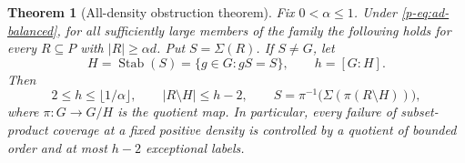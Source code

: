 \documentclass[11pt,a4paper]{article}
\newtheorem{theorem}{Theorem}[section]
\theoremstyle{definition}
\theoremstyle{remark}
\begin{document}
\begin{theorem}[All-density obstruction theorem]\label{p-thm:all-density}
Fix $0<\alpha\leq1$. Under \eqref{p-eq:ad-balanced}, for all sufficiently
large members of the family the following holds for every
$R\subseteq P$ with $|R|\geq\alpha d$.
Put $S=\Sigma(R)$. If $S\ne G$, let
\[
 H=\operatorname{Stab}(S)=\{g\in G:gS=S\},\qquad h=[G:H].
\]
Then
\begin{equation}\label{p-eq:ad-classification}
 2\leq h\leq\lfloor1/\alpha\rfloor,
 \qquad |R\setminus H|\leq h-2,
 \qquad
 S=\pi^{-1}\bigl(\Sigma(\pi(R\setminus H))\bigr),
\end{equation}
where $\pi:G\to G/H$ is the quotient map. In particular, every failure
of subset-product coverage at a fixed positive density is controlled
by a quotient of bounded order and at most $h-2$ exceptional labels.
\end{theorem}
\end{document}

